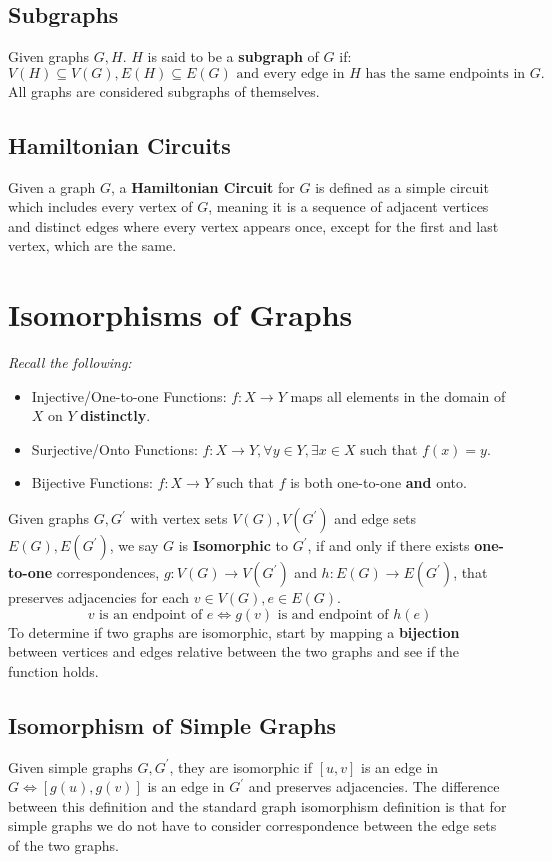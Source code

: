 \documentclass[a4paper]{article}
\begin{document}
  \subsection{Subgraphs}
  Given graphs $G,H$. $H$ is said to be a \textbf{subgraph} of $G$ if:
  \[
    V(H) \subseteq V(G), E(H) \subseteq E(G) \textrm{ and every edge in $H$ has the same endpoints in $G$.}
  \]
  All graphs are considered subgraphs of themselves.
  \subsection{Hamiltonian Circuits}
  Given a graph $G$, a \textbf{Hamiltonian Circuit} for $G$ is defined as a simple circuit which includes every vertex of $G$, meaning it is a sequence of adjacent vertices and distinct edges where every vertex appears once, except for the first and last vertex, which are the same.
  \section{Isomorphisms of Graphs} 
  \textit{Recall the following:}
  \begin{itemize}
    \item Injective/One-to-one Functions: $f: X\rightarrow Y$ maps all elements in the domain of $X$ on $Y$ \textbf{distinctly}.
    \item Surjective/Onto Functions: $f: X \rightarrow Y, \forall y \in Y, \exists x \in X$ such that $f(x) = y$.
    \item Bijective Functions: $f: X \rightarrow Y$ such that $f$ is both one-to-one \textbf{and} onto.
  \end{itemize}
  Given graphs $G,G^\prime$ with vertex sets $V(G),V(G^\prime)$ and edge sets $E(G),E(G^\prime)$, we say $G$ is \textbf{Isomorphic} to $G^\prime$, if and only if there exists \textbf{one-to-one} correspondences, $g: V(G) \rightarrow V(G^\prime)$ and $h: E(G) \rightarrow E(G^\prime)$, that preserves adjacencies for each $v \in V(G), e \in E(G)$.
  \[
    v \textrm{ is an endpoint of } e \Leftrightarrow g(v) \textrm{ is and endpoint of } h(e)
  \]
  To determine if two graphs are isomorphic, start by mapping a \textbf{bijection} between vertices and edges relative between the two graphs and see if the function holds.
  \subsection{Isomorphism of Simple Graphs}
  Given simple graphs $G,G^\prime$, they are isomorphic if $[u,v]$ is an edge in $G \Leftrightarrow [g(u),g(v)]$ is an edge in $G^\prime$ and preserves adjacencies. The difference between this definition and the standard graph isomorphism definition is that for simple graphs we do not have to consider correspondence between the edge sets of the two graphs.
\end{document}
